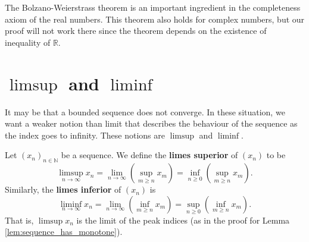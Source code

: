 \begin{remark}
    The Bolzano-Weierstrass theorem is an important ingredient in the completeness axiom of the real numbers. This theorem also holds for complex numbers, but our proof will not work there since the theorem depends on the existence of inequality of $\mathbb R$.
\end{remark}

\section{$\limsup$ and $\liminf$}

It may be that a bounded sequence does not converge. In these situation, we want a weaker notion than limit that describes the behaviour of the sequence as the index goes to infinity. These notions are $\limsup$ and $\liminf$.

\begin{definition}
    Let $(x_n)_{n\in\mathbb N}$ be a sequence. We define the \textbf{limes superior} of $(x_n)$ to be \[\limsup_{n\to\infty}x_n=\lim_{n\to\infty}\left(\sup_{m\geq n}x_m\right)=\inf_{n\geq0}\left(\sup_{m\geq n}x_m\right).\] Similarly, the \textbf{limes inferior} of $(x_n)$ is \[\liminf_{n\to\infty}x_n=\lim_{n\to\infty}\left(\inf_{m\geq n}x_m\right)=\sup_{n\geq0}\left(\inf_{m\geq n}x_m\right).\] That is, $\limsup{x_n}$ is the limit of the peak indices (as in the proof for Lemma \ref{lem:sequence_has_monotone}).
\end{definition}

